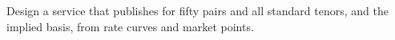 \begin{interviewq}\label{iq:m2:fx-swaps-forwards-and-the-cross-currency-basis:6}
Design a service that publishes  for fifty pairs and all standard
tenors, and the implied basis, from rate curves and market points.
\end{interviewq}
